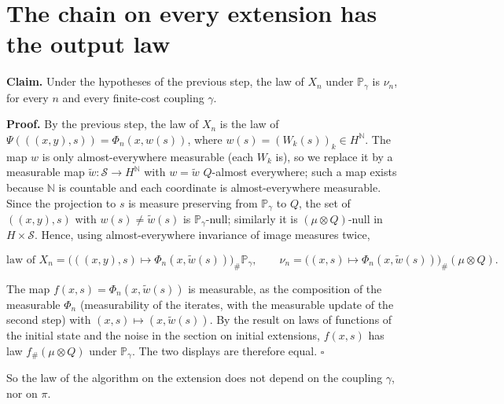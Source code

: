 \documentclass[11pt,a4paper]{article}
\begin{document}
\section{\texorpdfstring{The chain on every extension has the output law}{The chain on every extension has the output law}}


\textbf{Claim.} Under the hypotheses of the previous step, the law of \(X_n\) under \(\mathbb P_\gamma\) is \(\nu_n\), for every \(n\) and every finite-cost coupling \(\gamma\).




\textbf{Proof.} By the previous step, the law of \(X_n\) is the law of \(\Psi(((x,y),s))=\Phi_n(x,w(s))\), where \(w(s)=(W_k(s))_k\in H^{\mathbb N}\). The map \(w\) is only almost-everywhere measurable (each \(W_k\) is), so we replace it by a measurable map \(\tilde w:\mathcal S\to H^{\mathbb N}\) with \(w=\tilde w\) \(Q\)-almost everywhere; such a map exists because \(\mathbb N\) is countable and each coordinate is almost-everywhere measurable. Since the projection to \(s\) is measure preserving from \(\mathbb P_\gamma\) to \(Q\), the set of \(((x,y),s)\) with \(w(s)\neq\tilde w(s)\) is \(\mathbb P_\gamma\)-null; similarly it is \((\mu\otimes Q)\)-null in \(H\times\mathcal S\). Hence, using almost-everywhere invariance of image measures twice,


\[\text{law of }X_n=\bigl(((x,y),s)\mapsto\Phi_n(x,\tilde w(s))\bigr)_\#\mathbb P_\gamma,\qquad\nu_n=\bigl((x,s)\mapsto\Phi_n(x,\tilde w(s))\bigr)_\#(\mu\otimes Q).\]


The map \(f(x,s)=\Phi_n(x,\tilde w(s))\) is measurable, as the composition of the measurable \(\Phi_n\) (measurability of the iterates, with the measurable update of the second step) with \((x,s)\mapsto(x,\tilde w(s))\). By the result on laws of functions of the initial state and the noise in the section on initial extensions, \(f(x,s)\) has law \(f_\#(\mu\otimes Q)\) under \(\mathbb P_\gamma\). The two displays are therefore equal. \(\square\)




So the law of the algorithm on the extension does not depend on the coupling \(\gamma\), nor on \(\pi\).
\end{document}
